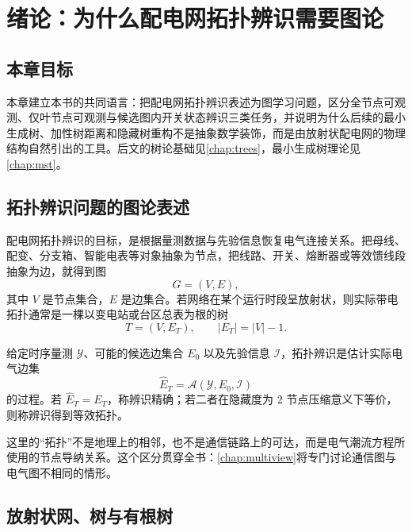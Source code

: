 \chapter{绪论：为什么配电网拓扑辨识需要图论}
\label{chap:intro}

\section*{本章目标}
本章建立本书的共同语言：把配电网拓扑辨识表述为图学习问题，区分全节点可观测、仅叶节点可观测与候选图内开关状态辨识三类任务，并说明为什么后续的最小生成树、加性树距离和隐藏树重构不是抽象数学装饰，而是由放射状配电网的物理结构自然引出的工具。后文的树论基础见\cref{chap:trees}，最小生成树理论见\cref{chap:mst}。

\section{拓扑辨识问题的图论表述}
\label{sec:topology_problem}

配电网拓扑辨识的目标，是根据量测数据与先验信息恢复电气连接关系。把母线、配变、分支箱、智能电表等对象抽象为节点，把线路、开关、熔断器或等效馈线段抽象为边，就得到图
\begin{equation}
  G=(V,E),
\end{equation}
其中 $V$ 是节点集合，$E$ 是边集合。若网络在某个运行时段呈放射状，则实际带电拓扑通常是一棵以变电站或台区总表为根的树
\begin{equation}
  T=(V,E_T), \qquad |E_T|=|V|-1 .
\end{equation}

\begin{definition}[配电网拓扑辨识]
给定时序量测 $\mathcal{Y}$、可能的候选边集合 $E_0$ 以及先验信息 $\mathcal{I}$，拓扑辨识是估计实际电气边集
\begin{equation}
  \widehat E_T = \mathcal{A}(\mathcal{Y},E_0,\mathcal{I})
\end{equation}
的过程。若 $\widehat E_T=E_T$，称辨识精确；若二者在隐藏度为 $2$ 节点压缩意义下等价，则称辨识得到等效拓扑。
\end{definition}

这里的“拓扑”不是地理上的相邻，也不是通信链路上的可达，而是电气潮流方程所使用的节点导纳关系。这个区分贯穿全书：\cref{chap:multiview}将专门讨论通信图与电气图不相同的情形。

\section{放射状网、树与有根树}

